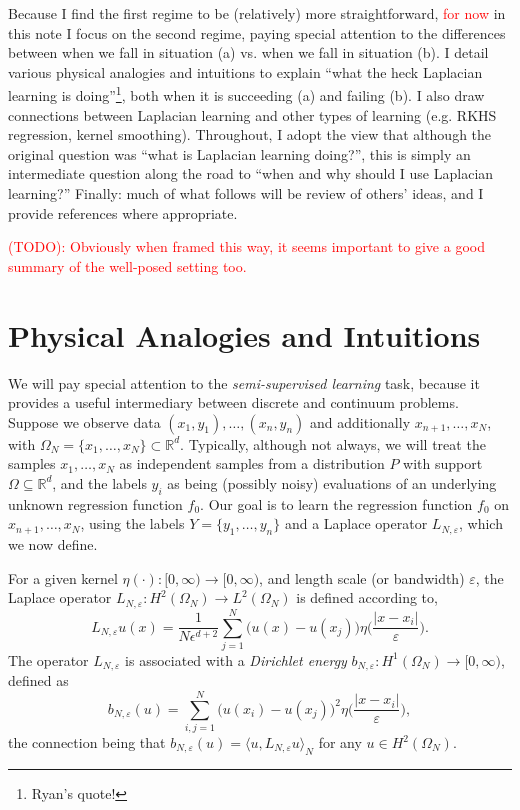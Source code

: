 \documentclass{article}
\newcommand{\Reals}{\mathbb{R}}
\newcommand{\1}{\mathbf{1}}
\newcommand{\Rd}{\Reals^d}
\newcommand{\dotp}[2]{\langle #1, #2 \rangle}
\theoremstyle{definition}
\theoremstyle{remark}
\begin{document}
Because I find the first regime to be (relatively) more straightforward, \textcolor{red}{for now} in this note I focus on the second regime, paying special attention to the differences between when we fall in situation (a) vs. when we fall in situation (b). I detail various physical analogies and intuitions to explain ``what the heck Laplacian learning is doing''\footnote{Ryan's quote!}, both when it is succeeding (a) and failing (b). I also draw connections between Laplacian learning and other types of learning (e.g. RKHS regression, kernel smoothing). Throughout, I adopt the view that although the original question was ``what is Laplacian learning doing?'', this is simply an intermediate question along the road to ``when and why should I use Laplacian learning?'' Finally: much of what follows will be review of others' ideas, and I provide references where appropriate.

\textcolor{red}{(TODO): Obviously when framed this way, it seems important to give a good summary of the well-posed setting too.}

\section{Physical Analogies and Intuitions} 
\label{sec:analogies_and_intution}

We will pay special attention to the \emph{semi-supervised learning} task, because it provides a useful intermediary between discrete and continuum problems. Suppose we observe data $(x_1,y_1),\ldots,(x_n,y_n)$ and additionally $x_{n + 1},\ldots,x_{N}$, with $\Omega_N = \{x_1,\ldots,x_N\} \subset \Rd$. Typically, although not always, we will treat the samples $x_1,\ldots,x_N$ as independent samples from a distribution $P$ with support $\Omega \subseteq \Rd$, and the labels $y_i$ as being (possibly noisy) evaluations of an underlying unknown regression function $f_0$. Our goal is to learn the regression function $f_0$ on $x_{n + 1},\ldots,x_{N}$, using the labels $Y = \{y_1,\ldots,y_n\}$ and a Laplace operator $L_{N,\varepsilon}$, which we now define.

For a given kernel $\eta(\cdot): [0,\infty) \to [0,\infty)$, and length scale (or bandwidth) $\varepsilon$, the Laplace operator $L_{N,\varepsilon}: H^2(\Omega_N) \to L^2(\Omega_N)$ is defined according to, 
\begin{equation*}
L_{N,\varepsilon}u(x) = \frac{1}{N\epsilon^{d + 2}}\sum_{j = 1}^{N} \bigl(u(x) - u(x_j)\bigr)\eta\biggl(\frac{|x - x_i|}{\varepsilon}\biggr).
\end{equation*}
The operator $L_{N,\varepsilon}$ is associated with a \emph{Dirichlet energy} $b_{N,\varepsilon}: H^1(\Omega_N) \to [0,\infty)$, defined as 
\begin{equation*}
b_{N,\varepsilon}(u) = \sum_{i,j = 1}^{N} \bigl(u(x_i) - u(x_j)\bigr)^2 \eta\biggl(\frac{|x - x_i|}{\varepsilon}\biggr),
\end{equation*}
the connection being that $b_{N,\varepsilon}(u) = \dotp{u}{L_{N,\varepsilon}u}_{N}$ for any $u \in H^2(\Omega_N)$. 
\end{document}
